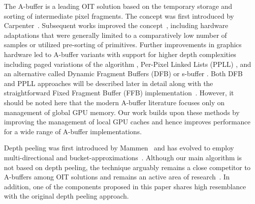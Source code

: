 \documentclass{egpubl}
\newcommand{\ab}{\mbox{A-buffer}}
\begin{document}
The \ab{} is a leading OIT solution based on the temporary storage and sorting of intermediate pixel fragments. 
The concept was first introduced by Carpenter~\cite{Carpenter1984}. 
Subsequent works improved the concept~\cite{ebert1990abuffer,bavoil2007multifragkbuffer,myers2007techrep,Kerzner2013,Vasilakis2014}, including hardware adaptations that were generally limited to a comparatively low number of samples or utilized pre-sorting of primitives. 
Further improvements in graphics hardware led to \ab{} variants with support for higher depth complexities including paged variations of the algorithm \cite{kainz2009ray,Crassin2010}, Per-Pixel Linked Lists (PPLL) \cite{Yang2010}, and an alternative called Dynamic Fragment Buffers (DFB) or s-buffer \cite{Maule2012,Vasilakis2012}. 
%
Both DFB and PPLL approaches will be described later in detail along with the straightforward Fixed Fragment Buffer (FFB) implementation~\cite{Crassin2010}. 
However, it should be noted here that the modern \ab{} literature focuses only on management of global GPU memory. 
Our work builds upon these methods by improving the management of local GPU caches and hence improves performance for a wide range of \ab{} implementations.

Depth peeling was first introduced by Mammen~\cite{Mammen1989} and has evolved to employ multi-directional and bucket-approximations~\cite{Everitt2001,carr2008depthpeel,Bavoil2008,Liu2009}. 
Although our main algorithm is not based on depth peeling, the technique arguably remains a close competitor to \ab{}s among OIT solutions and remains an active area of research~\cite{Vasilakis2013}. 
In addition, one of the components proposed in this paper shares high resemblance with the original depth peeling approach. 




\newcommand{\savecounter}[1]{\setcounter{#1}{\value{enumi}}}
\newcommand{\restorecounter}[1]{\setcounter{enumi}{\value{#1}}}
\newcommand{\savecounteri}{\setcounter{saveenumi}{\value{enumi}}}
\newcommand{\restorecounteri}{\setcounter{enumi}{\value{saveenumi}}}
\newcommand{\pause}[1]{\savecounteri\end{#1}}
\newcommand{\unpause}[1]{\begin{#1}\restorecounteri}
\newcommand{\unpausearg}[2]{\begin{#1}[#2]\restorecounteri}
\end{document}
